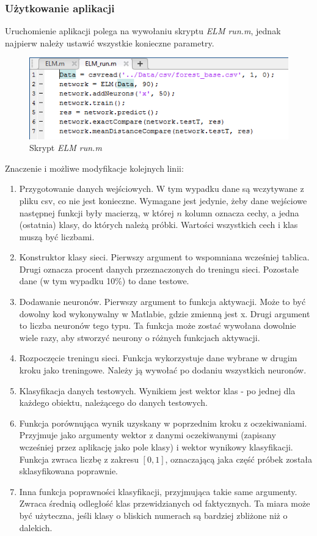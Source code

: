 \documentclass{article}
\begin{document}
\subsubsection*{Użytkowanie aplikacji}
Uruchomienie aplikacji polega na wywołaniu skryptu \textit{ELM \textunderscore run.m}, jednak najpierw należy ustawić wszystkie konieczne parametry.
\begin{figure}[H]
\centering
\includegraphics[width=1\textwidth]{elm_run.png}
\caption{Skrypt \textit{ELM \textunderscore run.m}}
\end{figure}
Znaczenie i możliwe modyfikacje kolejnych linii:
\begin{enumerate}
\item Przygotowanie danych wejściowych.
W tym wypadku dane są wczytywane z pliku csv, co nie jest konieczne.
Wymagane jest jedynie, żeby dane wejściowe następnej funkcji były macierzą, w której $n$ kolumn oznacza cechy, a jedna (ostatnia) klasy, do których należą próbki. Wartości wszystkich cech i klas muszą być liczbami.
\item Konstruktor klasy sieci. 
Pierwszy argument to wspomniana wcześniej tablica. 
Drugi oznacza procent danych przeznaczonych do treningu sieci.
Pozostałe dane (w tym wypadku 10\%) to dane testowe.
\item Dodawanie neuronów.
Pierwszy argument to funkcja aktywacji.
Może to być dowolny kod wykonywalny w Matlabie, gdzie zmienną jest x.
Drugi argument to liczba neuronów tego typu.
Ta funkcja może zostać wywołana dowolnie wiele razy, aby stworzyć neurony o różnych funkcjach aktywacji.
\item Rozpoczęcie treningu sieci. 
Funkcja wykorzystuje dane wybrane w drugim kroku jako treningowe.
Należy ją wywołać po dodaniu wszystkich neuronów.
\item Klasyfikacja danych testowych.
Wynikiem jest wektor klas - po jednej dla każdego obiektu, należącego do danych testowych.
\item Funkcja porównująca wynik uzyskany w poprzednim kroku z oczekiwaniami.
Przyjmuje jako argumenty wektor z danymi oczekiwanymi (zapisany wcześniej przez aplikację jako pole klasy) i wektor wynikowy klasyfikacji.
Funkcja zwraca liczbę z zakresu $[0, 1]$, oznaczającą jaka część próbek została sklasyfikowana poprawnie.
\item Inna funkcja poprawności klasyfikacji, przyjmująca takie same argumenty.
Zwraca średnią odległość klas przewidzianych od faktycznych.
Ta miara może być użyteczna, jeśli klasy o bliskich numerach są bardziej zbliżone niż o dalekich.
\end{enumerate}
\end{document}
